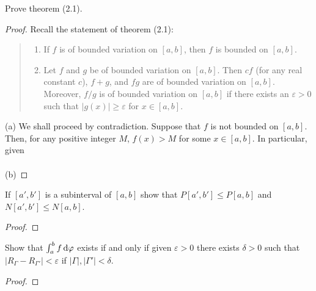 \begin{problem}
Prove theorem (2.1).
\end{problem}
\begin{proof}
Recall the statement of theorem (2.1):
\begin{quote}
\begin{enumerate}[label=(\alph*)]
\item If $f$ is of bounded variation on $[a,b]$, then $f$ is bounded on
  $[a,b]$.
\item Let $f$ and $g$ be of bounded variation on $[a,b]$. Then $cf$ (for
  any real constant $c$), $f+g$, and $fg$ are of bounded variation on
  $[a,b]$. Moreover, $f/g$ is of bounded variation on $[a,b]$ if there
  exists an $\varepsilon>0$ such that $|g(x)|\geq\varepsilon$ for
  $x\in[a,b]$.
\end{enumerate}
\end{quote}
\noindent
(a) We shall proceed by contradiction. Suppose that $f$ is not bounded on
$[a,b]$. Then, for any positive integer $M$, $f(x)>M$ for some
$x\in[a,b]$. In particular, given
\\\\
(b)
\end{proof}

\begin{problem}
If $[a',b']$ is a subinterval of $[a,b]$ show that $P[a',b']\leq P[a,b]$
and $N[a',b']\leq N[a,b]$.
\end{problem}
\begin{proof}
\end{proof}
\begin{problem}
Show that $\int_a^bf\mathop{}\!\mathrm{d}\varphi$ exists if and only if given $\varepsilon>0$
there exists $\delta>0$ such that
$\left|R_\Gamma-R_{\Gamma'}\right|<\varepsilon$ if
$|\Gamma|,|\Gamma'|<\delta$.
\end{problem}
\begin{proof}
\end{proof}

